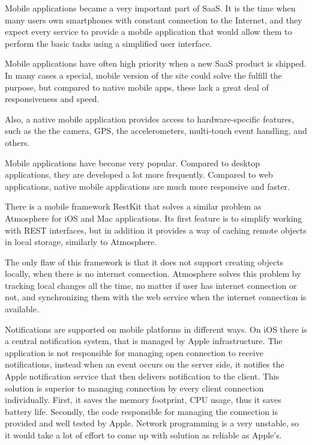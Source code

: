 Mobile applications became a very important part of SaaS. It is the time when many users own smartphones with constant connection to the Internet, and they expect every service to provide a mobile application that would allow them to perform the basic tasks using a simplified user interface. \citep{facebook_stats}

Mobile applications have often high priority when a new SaaS product is shipped. In many cases a special, mobile version of the site could solve the fulfill the purpose, but compared to native mobile apps, these lack a great deal of responsiveness and speed.

Also, a native mobile application provides access to hardware-specific features, such as the the camera, GPS, the accelerometers, multi-touch event handling, and others.

Mobile applications have become very popular. \citep{facebook_stats} Compared to desktop applications, they are developed a lot more frequently. Compared to web applications, native mobile applications are much more responsive and faster.

There is a mobile framework RestKit \citep{restkit} that solves a similar problem as Atmosphere for iOS and Mac applications. Its first feature is to simplify working with REST interfaces, but in addition it provides a way of caching remote objects in local storage, similarly to Atmosphere.

The only flaw of this framework is that it does not support creating objects locally, when there is no internet connection. Atmosphere solves this problem by tracking local changes all the time, no matter if user has internet connection or not, and synchronizing them with the web service when the internet connection is available.

Notifications are supported on mobile platforms in different ways. On iOS there is a central notification system, that is managed by Apple infrastructure. \citep{iphone_ipad_book} The application is not responsible for managing open connection to receive notifications, instead when an event occurs on the server side, it notifies the Apple notification service that then delivers notification to the client. This solution is superior to managing connection by every client connection individually. First, it saves the memory footprint, CPU usage, thus it saves battery life. Secondly, the code responsible for managing the connection is provided and well tested by Apple. Network programming is a very unstable, so it would take a lot of effort to come up with solution as reliable as Apple's. 

